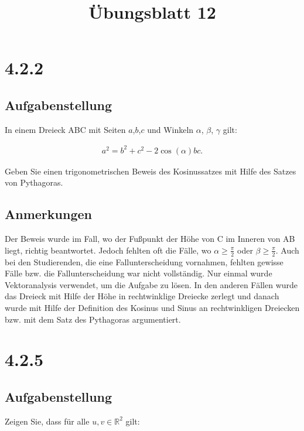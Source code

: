 \documentclass[a4paper]{article}
\title{Übungsblatt 12}
\date{}
\author{}
\newcommand*{\R}{\mathbb R}
\begin{document}
\maketitle

\section{4.2.2}

\subsection{Aufgabenstellung}

In einem Dreieck ABC mit Seiten $a$,$b$,$c$ und Winkeln $\alpha$, $\beta$, $\gamma$ gilt:

\begin{align}
  a^2 = b^2 + c^2 -2\cos(\alpha) bc.
\end{align}

Geben Sie einen trigonometrischen Beweis des Kosinussatzes mit Hilfe des Satzes von Pythagoras.

\subsection{Anmerkungen}

Der Beweis wurde im Fall, wo der Fußpunkt der Höhe von C im Inneren von AB liegt, richtig beantwortet. Jedoch fehlten oft die Fälle, wo $\alpha \ge \frac \pi2$ oder $\beta \ge \frac \pi2$. Auch bei den Studierenden, die eine Fallunterscheidung vornahmen, fehlten gewisse Fälle bzw. die Fallunterscheidung war nicht vollständig. Nur einmal wurde Vektoranalysis verwendet, um die Aufgabe zu lösen. In den anderen Fällen wurde das Dreieck mit Hilfe der Höhe in rechtwinklige Dreiecke zerlegt und danach wurde mit Hilfe der Definition des Kosinus und Sinus an rechtwinkligen Dreiecken bzw. mit dem Satz des Pythagoras argumentiert.

\section{4.2.5}

\subsection{Aufgabenstellung}

Zeigen Sie, dass für alle $u,v\in\R^2$ gilt:

\newcommand*{\pr}[2]{\operatorname{pr}_{#1}\left( #2 \right)}
\newcommand*{\s}[1]{\langle {#1} \rangle}
\end{document}
